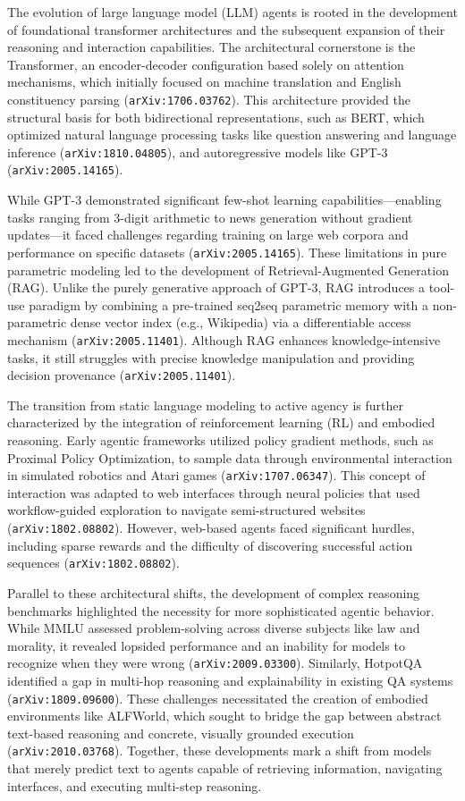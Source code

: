 \documentclass[11pt]{article}
\begin{document}
The evolution of large language model (LLM) agents is rooted in the development of foundational transformer architectures and the subsequent expansion of their reasoning and interaction capabilities. The architectural cornerstone is the Transformer, an encoder-decoder configuration based solely on attention mechanisms, which initially focused on machine translation and English constituency parsing (\texttt{arXiv:1706.03762}). This architecture provided the structural basis for both bidirectional representations, such as BERT, which optimized natural language processing tasks like question answering and language inference (\texttt{arXiv:1810.04805}), and autoregressive models like GPT-3 (\texttt{arXiv:2005.14165}).

While GPT-3 demonstrated significant few-shot learning capabilities—enabling tasks ranging from 3-digit arithmetic to news generation without gradient updates—it faced challenges regarding training on large web corpora and performance on specific datasets (\texttt{arXiv:2005.14165}). These limitations in pure parametric modeling led to the development of Retrieval-Augmented Generation (RAG). Unlike the purely generative approach of GPT-3, RAG introduces a tool-use paradigm by combining a pre-trained seq2seq parametric memory with a non-parametric dense vector index (e.g., Wikipedia) via a differentiable access mechanism (\texttt{arXiv:2005.11401}). Although RAG enhances knowledge-intensive tasks, it still struggles with precise knowledge manipulation and providing decision provenance (\texttt{arXiv:2005.11401}).

The transition from static language modeling to active agency is further characterized by the integration of reinforcement learning (RL) and embodied reasoning. Early agentic frameworks utilized policy gradient methods, such as Proximal Policy Optimization, to sample data through environmental interaction in simulated robotics and Atari games (\texttt{arXiv:1707.06347}). This concept of interaction was adapted to web interfaces through neural policies that used workflow-guided exploration to navigate semi-structured websites (\texttt{arXiv:1802.08802}). However, web-based agents faced significant hurdles, including sparse rewards and the difficulty of discovering successful action sequences (\texttt{arXiv:1802.08802}).

Parallel to these architectural shifts, the development of complex reasoning benchmarks highlighted the necessity for more sophisticated agentic behavior. While MMLU assessed problem-solving across diverse subjects like law and morality, it revealed lopsided performance and an inability for models to recognize when they were wrong (\texttt{arXiv:2009.03300}). Similarly, HotpotQA identified a gap in multi-hop reasoning and explainability in existing QA systems (\texttt{arXiv:1809.09600}). These challenges necessitated the creation of embodied environments like ALFWorld, which sought to bridge the gap between abstract text-based reasoning and concrete, visually grounded execution (\texttt{arXiv:2010.03768}). Together, these developments mark a shift from models that merely predict text to agents capable of retrieving information, navigating interfaces, and executing multi-step reasoning.
\end{document}
